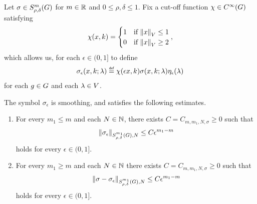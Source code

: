 \begin{corollary}
    Let $\sigma \in \SymbolClass m {\rho, \delta}$ for $m \in \R$ and $0 \leq \rho, \delta \leq 1$.
    Fix a cut-off function $\chi \in \SmoothFunctions \Group$ satisfying
    \begin{align*}
        \chi(x, k) =
        \begin{cases}
            1 & \text{if } \norm x \leq 1\\
            0 & \text{if } \norm x \geq 2
        \end{cases},
    \end{align*}
    which allows us, for each $\epsilon \in (0, 1]$ to define
    \begin{align*}
        \sigma_\epsilon(x, k; \lambda) \defeq \chi(\epsilon x, k) \sigma(x, k; \lambda) \eta_\epsilon(\lambda)
    \end{align*}
    for each $g \in \Group$ and each $\lambda \in \VectorSpace$.

    The symbol $\sigma_\epsilon$ is smoothing,
    and satisfies the following estimates.
    \begin{enumerate}
        \item For every $m_1 \leq m$ and each $N \in \N$,
            there exists $C = C_{m, m_1, N, \sigma} \geq 0$ such that
            \begin{align*}
                \SymbolSemiNorm {m_1} {\rho, \delta} N {\sigma_\epsilon}
                \leq C \epsilon^{m_1 - m}
            \end{align*}
            holds for every $\epsilon \in (0, 1]$.
        \item For every $m_1 \geq m$ and each $N \in \N$
            there exists $C = C_{m, m_1, N, \sigma} \geq 0$ such that
            \begin{align*}
                \SymbolSemiNorm {m_1} {\rho, \delta} N {\sigma - \sigma_\epsilon}
                \leq C \epsilon^{m_1 - m}
            \end{align*}
            holds for every $\epsilon \in (0, 1]$.
    \end{enumerate}
\end{corollary}


